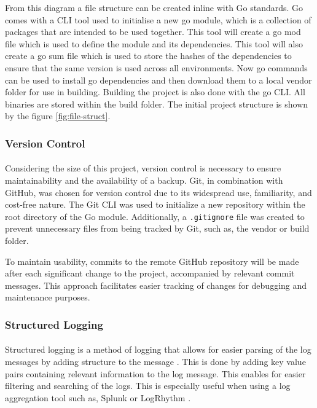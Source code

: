 \documentclass[12pt, conference, final, a4paper, onecolumn, compsoc]{IEEEtran}
\begin{document}
From this diagram a file structure can be created inline with Go standards. Go
comes with a CLI tool used to initialise a new go module, which is a collection
of packages that are intended to be used together. This tool will create a go
mod file which is used to define the module and its dependencies. This tool will
also create a go sum file which is used to store the hashes of the dependencies
to ensure that the same version is used across all environments. Now go commands
can be used to install go dependencies and then download them to a local vendor
folder for use in building. Building the project is also done with the go CLI.
All binaries are stored within the build folder. The initial project structure
is shown by the figure \ref{fig:file-struct}.

\subsubsection*{Version Control}
\paragraph{}

Considering the size of this project, version control is necessary to ensure
maintainability and the availability of a backup. Git, in combination with
GitHub, was chosen for version control due to its widespread use, familiarity,
and cost-free nature. The Git CLI was used to initialize a new repository within
the root directory of the Go module. Additionally, a \texttt{.gitignore} file
was created to prevent unnecessary files from being tracked by Git, such as, the
vendor or build folder.

To maintain usability, commits to the remote GitHub repository will be made
after each significant change to the project, accompanied by relevant commit
messages. This approach facilitates easier tracking of changes for debugging and
maintenance purposes.

\subsubsection*{Structured Logging}
\paragraph{}

Structured logging is a method of logging that allows for easier parsing of the
log messages by adding structure to the message \citep{struct-log}. This is done by adding key
value pairs containing relevant information to the log message. This enables for
easier filtering and searching of the logs. This is especially useful when using
a log aggregation tool such as, Splunk or LogRhythm \citep{struct-log}.
\end{document}
